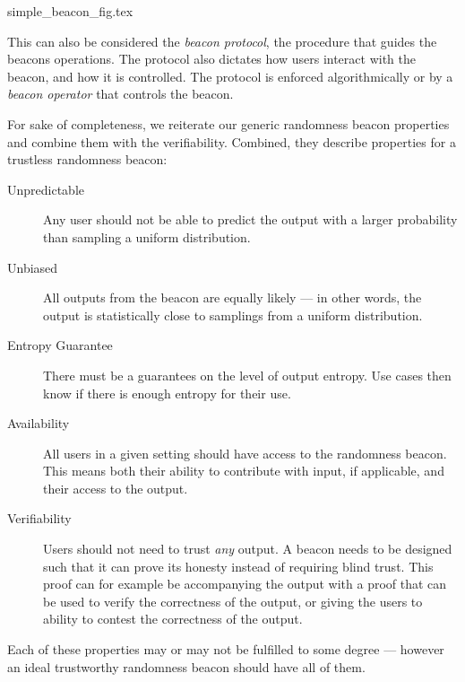 {simple_beacon_fig.tex}

This can also be considered the \emph{beacon protocol}, the procedure that guides the beacons operations. The protocol also dictates how users interact with the beacon, and how it is controlled. The protocol is enforced algorithmically or by a \emph{beacon operator} that controls the beacon.

For sake of completeness, we reiterate our generic randomness beacon properties and combine them with the verifiability. Combined, they describe properties for a trustless randomness beacon:

\begin{description}
    \item[Unpredictable]
        Any user should not be able to predict the output with a larger probability than sampling a uniform distribution.
    \item[Unbiased]
        All outputs from the beacon are equally likely --- in other words, the output is statistically close to samplings from a uniform distribution.
    \item[Entropy Guarantee]
		There must be a guarantees on the level of output entropy. Use cases then know if there is enough entropy for their use.
    \item[Availability]
        All users in a given setting should have access to the randomness beacon.
        This means both their ability to contribute with input, if applicable, and their access to the output.
    \item[Verifiability]
        Users should not need to trust \emph{any} output.
        A beacon needs to be designed such that it can prove its honesty instead of requiring blind trust.
        This proof can for example be accompanying the output with a proof that can be used to verify the correctness of the output, or giving the users to ability to contest the correctness of the output.
\end{description}

Each of these properties may or may not be fulfilled to some degree --- however an ideal trustworthy randomness beacon should have all of them.%

